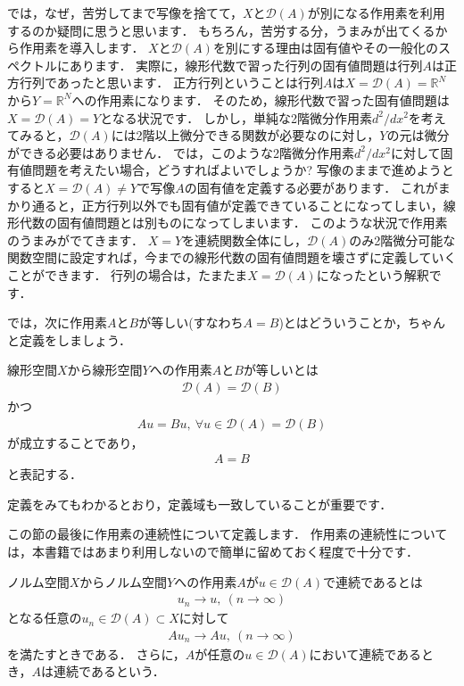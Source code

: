 では，なぜ，苦労してまで写像を捨てて，$X$と${\mathcal D}(A)$が別になる作用素を利用するのか疑問に思うと思います．
もちろん，苦労する分，うまみが出てくるから作用素を導入します．
$X$と${\mathcal D}(A)$を別にする理由は固有値やその一般化のスペクトルにあります．
実際に，線形代数で習った行列の固有値問題は行列$A$は正方行列であったと思います．
正方行列ということは行列$A$は$X = {\mathcal D}(A) = {\mathbb R}^N$から$Y = {\mathbb R}^N$への作用素になります．
そのため，線形代数で習った固有値問題は$X = {\mathcal D}(A) = Y$となる状況です．
しかし，単純な2階微分作用素$d^2/dx^2$を考えてみると，${\mathcal D}(A)$には2階以上微分できる関数が必要なのに対し，$Y$の元は微分ができる必要はありません．
では，このような2階微分作用素$d^2/dx^2$に対して固有値問題を考えたい場合，どうすればよいでしょうか?
写像のままで進めようとすると$X = {\mathcal D}(A) \neq Y$で写像$A$の固有値を定義する必要があります．
これがまかり通ると，正方行列以外でも固有値が定義できていることになってしまい，線形代数の固有値問題とは別ものになってしまいます．
このような状況で作用素のうまみがでてきます．
$X=Y$を連続関数全体にし，${\mathcal D}(A)$のみ2階微分可能な関数空間に設定すれば，今までの線形代数の固有値問題を壊さずに定義していくことができます．
行列の場合は，たまたま$X = {\mathcal D}(A)$になったという解釈です．

では，次に作用素$A$と$B$が等しい(すなわち$A=B$)とはどういうことか，ちゃんと定義をしましょう．

\begin{defi}[作用素の等号]\label{def:operator_equal}
線形空間$X$から線形空間$Y$への作用素$A$と$B$が等しいとは
\begin{align*}
{\mathcal D}(A) = {\mathcal D}(B)
\end{align*}
かつ
\begin{align*}
A u = B u, ~ \forall u \in {\mathcal D}(A) = {\mathcal D}(B)
\end{align*}
が成立することであり，
\begin{align*}
A = B
\end{align*}
と表記する．
\end{defi}

定義をみてもわかるとおり，定義域も一致していることが重要です．

この節の最後に作用素の連続性について定義します．
作用素の連続性については，本書籍ではあまり利用しないので簡単に留めておく程度で十分です．

\begin{defi}[作用素の連続]\label{def:operator_continue}
ノルム空間$X$からノルム空間$Y$への作用素$A$が$u \in {\mathcal D}(A)$で連続であるとは
\begin{align*}
	u_n \rightarrow u, ~ (n \rightarrow \infty)
\end{align*}
となる任意の$u_n \in {\mathcal D}(A) \subset X$に対して
\begin{align*}
	A u_n \rightarrow A u, ~ (n \rightarrow \infty)
\end{align*}
を満たすときである．
さらに，$A$が任意の$u \in {\mathcal D}(A)$において連続であるとき，$A$は連続であるという．
\end{defi}

